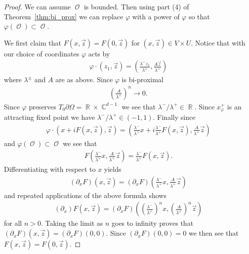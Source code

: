\documentclass[12pt]{amsart}
\theoremstyle{plain}
\theoremstyle{definition}
\theoremstyle{remark}
\begin{document}
\begin{proof}
We can assume $\operatorname{\mathcal{O}}$ is bounded. Then using part (4) of Theorem~\ref{thm:bi_prox} we can replace $\varphi$ with a power of $\varphi$ so that $\varphi(\operatorname{\mathcal{O}}) \subset \operatorname{\mathcal{O}}$.

We first claim that $F(x,\vec{z}) = F(0,\vec{z})$ for $(x,\vec{z}) \in V \times U$. Notice that with our choice of coordinates $\varphi$ acts by
\begin{align*}
\varphi \cdot (z_1, \vec{z}) = \left( \frac{\lambda^-z_1}{\lambda^+}, \frac{A\vec{z}}{\lambda^+}\right)
\end{align*}
where $\lambda^{\pm}$ and $A$ are as above. Since $\varphi$ is bi-proximal 
\begin{align*}
\left(\frac{A}{\lambda^+}\right)^n \rightarrow 0.
\end{align*}
Since $\varphi$ preserves $T_0\partial \Omega = \operatorname{\mathbb{R}} \times \operatorname{\mathbb{C}}^{d-1}$ we see that $\lambda^-/\lambda^+ \in \operatorname{\mathbb{R}}$. Since $x^+_{\varphi}$ is an attracting fixed point we have $\lambda^-/\lambda^+ \in (-1,1)$. Finally since
\begin{align*}
\varphi \cdot (x+iF(x,\vec{z}), \vec{z}) = \left( \frac{\lambda^-}{\lambda^+}x+i\frac{\lambda^-}{\lambda^+}F\left(x,\vec{z}\right), \frac{A}{\lambda^+}\vec{z}\right)
\end{align*}
and $\varphi(\operatorname{\mathcal{O}}) \subset \operatorname{\mathcal{O}}$ we see that 
\begin{align*}
F\left(\frac{\lambda^-}{\lambda^+}x,\frac{A}{\lambda^+}\vec{z}\right)=\frac{\lambda^-}{\lambda^+}F(x,\vec{z}).
\end{align*}
Differentiating with respect to $x$ yields
\begin{align*}
(\partial_x F)(x,\vec{z}) = (\partial_x F)\left(\frac{\lambda^-}{\lambda^+}x, \frac{A}{\lambda^+}\vec{z}\right)
\end{align*}
and repeated applications of the above formula shows
\begin{align*}
(\partial_x) F(x,\vec{z}) = (\partial_x F)\left(\left(\frac{\lambda^-}{\lambda^+}\right)^nx, \left(\frac{A}{\lambda^+}\right)^n\vec{z}\right)
\end{align*}
for all $n>0$. Taking the limit as $n$ goes to infinity proves that $(\partial_x F)(x,\vec{z}) = (\partial_x F)(0,0)$. Since $(\partial_x F)(0,0)=0$ we then see that $F(x,\vec{z}) = F(0,\vec{z})$.  


\end{proof}
\end{document}
